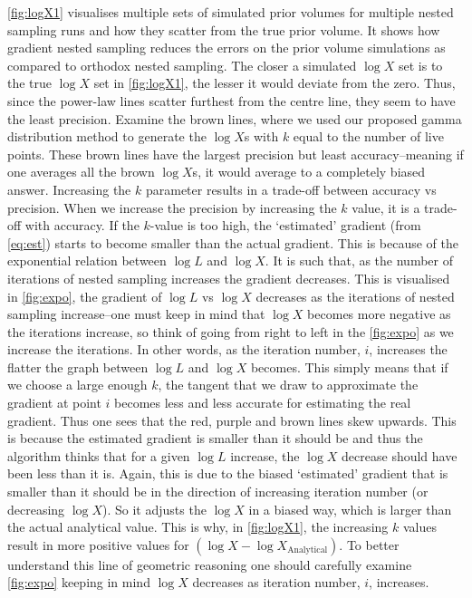 \cref{fig:logX1} visualises multiple sets of simulated prior volumes for multiple nested sampling runs and how they scatter from the true prior volume. It shows how gradient nested sampling reduces the errors on the prior volume simulations as compared to orthodox nested sampling. The closer a simulated $\log X$ set is to the true $\log X$ set in \cref{fig:logX1}, the lesser it would deviate from the zero. Thus, since the power-law lines scatter furthest from the centre line, they seem to have the least precision. Examine the brown lines, where we used our proposed gamma distribution method to generate the $\log X$s with $k$ equal to the number of live points. These brown lines have the largest precision but least accuracy--meaning if one averages all the brown $\log X$s, it would average to a completely biased answer. Increasing the $k$ parameter results in a trade-off between accuracy vs precision. When we increase the precision by increasing the $k$ value, it is a trade-off with accuracy. If the $k$-value is too high, the `estimated' gradient (from \cref{eq:est}) starts to become smaller than the actual gradient. This is because of the exponential relation between $\log L$ and $\log X$. It is such that, as the number of iterations of nested sampling increases the gradient decreases. This is visualised in \cref{fig:expo}, the gradient of $\log L$ vs $\log X$ decreases as the iterations of nested sampling increase--one must keep in mind that $\log X$ becomes more negative as the iterations increase, so think of going from right to left in the \cref{fig:expo} as we increase the iterations. In other words, as the iteration number, $i$, increases the flatter the graph between $\log L$ and $\log X$ becomes. This simply means that if we choose a large enough $k$, the tangent that we draw to approximate the gradient at point $i$ becomes less and less accurate for estimating the real gradient. Thus one sees that the red, purple and brown lines skew upwards. This is because the estimated gradient is smaller than it should be and thus the algorithm thinks that for a given $\log L$ increase, the $\log X$ decrease should have been less than it is. Again, this is due to the biased `estimated' gradient that is smaller than it should be in the direction of increasing iteration number (or decreasing $\log X$). So it adjusts the $\log X$ in a biased way, which is larger than the actual analytical value. This is why, in \cref{fig:logX1}, the increasing $k$ values result in more positive values for $(\log X -\log X_{\mathrm{Analytical}})$. To better understand this line of geometric reasoning one should carefully examine \cref{fig:expo} keeping in mind $\log X$ decreases as iteration number, $i$, increases.



